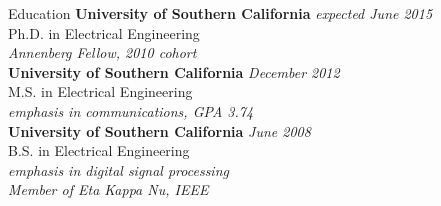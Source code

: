 \documentclass{resume} %
\begin{document}
%


\begin{rSection}{Education}
{\bf University of Southern California} \hfill {\em expected June 2015} \\
Ph.D. in Electrical Engineering \\
\medskip
\emph{Annenberg Fellow, 2010 cohort} \\
{\bf University of Southern California} \hfill {\em December 2012} \\
M.S. in Electrical Engineering \\
\medskip
\emph{emphasis in communications, GPA 3.74}\\
{\bf University of Southern California} \hfill {\em June 2008} \\ 
B.S. in Electrical Engineering \\
\emph{emphasis in digital signal processing}\\
\emph{Member of Eta Kappa Nu, IEEE}
\end{rSection}

\end{document}
